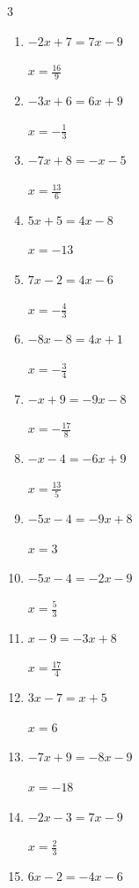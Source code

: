 \begin{multicols}{3}
\begin{enumerate}
  \item $-2x+7=7x-9$

        $\displaystyle x=\frac{16}{9}$

  \item $-3x+6=6x+9$

        $\displaystyle x=-\frac{1}{3}$

  \item $-7x+8=-x-5$

        $\displaystyle x=\frac{13}{6}$

  \item $5x+5=4x-8$

        $\displaystyle x=-13$

  \item $7x-2=4x-6$

        $\displaystyle x=-\frac{4}{3}$

  \item $-8x-8=4x+1$

        $\displaystyle x=-\frac{3}{4}$

  \item $-x+9=-9x-8$

        $\displaystyle x=-\frac{17}{8}$

  \item $-x-4=-6x+9$

        $\displaystyle x=\frac{13}{5}$

\columnbreak %

  \item $-5x-4=-9x+8$

        $\displaystyle x=3$

  \item $-5x-4=-2x-9$

        $\displaystyle x=\frac{5}{3}$

  \item $x-9=-3x+8$

        $\displaystyle x=\frac{17}{4}$

  \item $3x-7=x+5$

        $\displaystyle x=6$

  \item $-7x+9=-8x-9$

        $\displaystyle x=-18$

  \item $-2x-3=7x-9$

        $\displaystyle x=\frac{2}{3}$

  \item $6x-2=-4x-6$


\end{enumerate}
\end{multicols}
